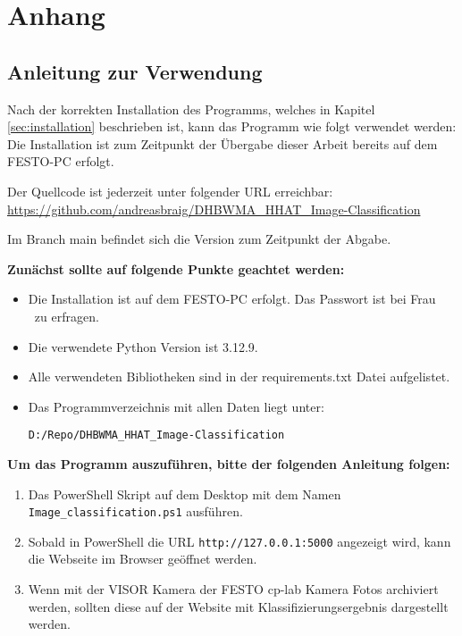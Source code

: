\appendix
\renewcommand{\thesection}{\Alph{section}} %
\renewcommand{\thesubsection}{\thesection.\arabic{subsection}} %
\renewcommand*{\sectionmark}[1]{\markright{Anhang \thesection: #1}}

\chapter{Anhang}
    
\section{Anleitung zur Verwendung} \label{subsec:anleitung_zur_verwendung}

Nach der korrekten Installation des Programms, welches in Kapitel \ref{sec:installation} beschrieben ist, kann das Programm wie folgt verwendet werden:
Die Installation ist zum Zeitpunkt der Übergabe dieser Arbeit bereits auf dem FESTO-PC erfolgt. 

Der Quellcode ist jederzeit unter folgender URL erreichbar: 
\url{https://github.com/andreasbraig/DHBWMA_HHAT_Image-Classification}

Im Branch main befindet sich die Version zum Zeitpunkt der Abgabe.

\textbf{Zunächst sollte auf folgende Punkte geachtet werden:}
\begin{itemize}
    \item Die Installation ist auf dem FESTO-PC erfolgt. Das Passwort ist bei Frau \BetreuerDHBW \ zu erfragen.
    \item Die verwendete Python Version ist 3.12.9.
    \item Alle verwendeten Bibliotheken sind in der requirements.txt Datei aufgelistet.
    \item Das Programmverzeichnis mit allen Daten liegt unter: 
    
    \texttt{D:/Repo/DHBWMA\_HHAT\_Image-Classification}
\end{itemize}


\textbf{Um das Programm auszuführen, bitte der folgenden Anleitung folgen:}

\begin{enumerate}
    \item Das PowerShell Skript auf dem Desktop mit dem Namen \texttt{Image\_classification.ps1} ausführen.
    \item Sobald in PowerShell die URL \texttt{http://127.0.0.1:5000} angezeigt wird, kann die Webseite im Browser geöffnet werden.
    \item Wenn mit der VISOR Kamera der FESTO \ac{cp-lab} Kamera Fotos archiviert werden, sollten diese auf der Website mit Klassifizierungsergebnis dargestellt werden. 
\end{enumerate}

